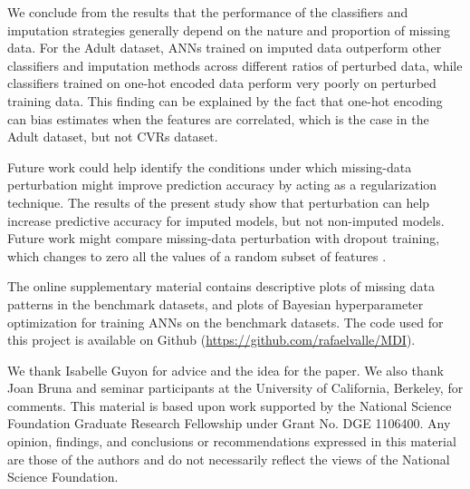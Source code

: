 \documentclass[10pt]{book}
\theoremstyle{definition}
\begin{document}
We conclude from the results that the performance of the classifiers and imputation strategies generally depend on the nature and proportion of missing data. For the Adult dataset, ANNs trained on imputed data outperform other classifiers and imputation methods across different ratios of perturbed data, while classifiers trained on one-hot encoded data perform very poorly on perturbed training data. This finding can be explained by the fact that one-hot encoding can bias estimates when the features are correlated, which is the case in the Adult dataset, but not CVRs dataset. 

Future work could help identify the conditions under which missing-data perturbation might improve prediction accuracy by acting as a regularization technique. The results of the present study show that perturbation can help increase predictive accuracy for imputed models, but not non-imputed models. Future work might compare missing-data perturbation with dropout training, which changes to zero all the values of a random subset of features \citep{hinton2012, maaten2013, wang2013}. 

\par
\vskip 14pt

The online supplementary material contains descriptive plots of missing data patterns in the benchmark datasets, and plots of Bayesian hyperparameter optimization for training ANNs on the benchmark datasets. The code used for this project is available on Github (\url{https://github.com/rafaelvalle/MDI}).

\par
\vskip 14pt

We thank Isabelle Guyon for advice and the idea for the paper. We also thank Joan Bruna and seminar participants at the University of California, Berkeley, for comments. This material is based upon work supported by the National Science Foundation Graduate Research Fellowship under Grant No. DGE 1106400. Any opinion, findings, and conclusions or recommendations expressed in this material are those of the authors and do not necessarily reflect the views of the National Science Foundation.
\par
\end{document}
